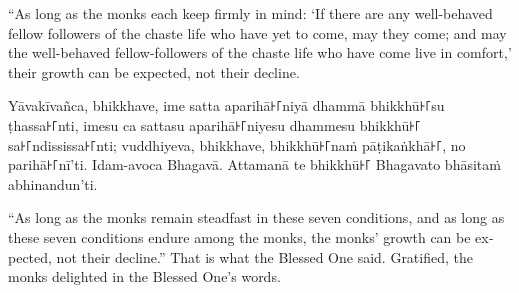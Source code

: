 \documentclass[
  babelLanguage=portuguese,
  final,
  a4Paper,
]{chantingbook}
\begin{document}
\begin{english}
  “As long as the monks each keep firmly in mind: `If there are any well-behaved
  fellow followers of the chaste life who have yet to come, may they come; and
  may the well-behaved fellow-followers of the chaste life who have come live in
  comfort,' their growth can be expected, not their decline.
\end{english}

Yāvakīvañca, bhikkhave, ime satta aparihā꜔꜒niyā dhammā bhikkhū꜔꜒su ṭhassa꜔꜒nti, imesu
ca sattasu aparihā꜔꜒niyesu dhammesu bhikkhū꜔꜒ sa꜔꜒ndississa꜔꜒nti; vuddhiyeva, bhikkhave,
bhikkhū꜔꜒naṁ pāṭikaṅkhā꜔꜒, no parihā꜔꜒nī'ti. Idam-avoca Bhagavā. Attamanā te bhikkhū꜔꜒
Bhagavato bhāsitaṁ abhinandun'ti.

\begin{english}
  “As long as the monks remain steadfast in these seven conditions, and as long
  as these seven conditions endure among the monks, the monks' growth can be
  expected, not their decline.” That is what the Blessed One said. Gratified,
  the monks delighted in the Blessed One's words.
\end{english}
\end{document}
